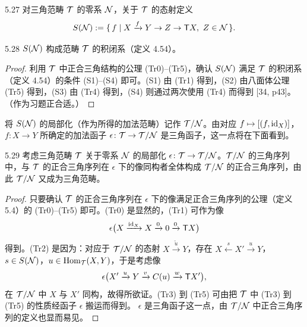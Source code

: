 \begin{definition}{5.27}
对三角范畴 $\mathcal{T}$ 的零系 $\mathcal{N}$，关于 $\mathcal{T}$ 的态射定义
\[
  S(\mathcal{N}) := \{\, f \mid X\xrightarrow{f}Y\to Z\to \mathsf{T} X,\ Z\in\mathcal{N} \,\}.
\]
\end{definition}

\begin{proposition}{5.28}
$S(\mathcal{N})$ 构成范畴 $\mathcal{T}$ 的积闭系（定义 4.54）。
\end{proposition}

\begin{proof}
利用 $\mathcal{T}$ 中正合三角结构的公理 (Tr0)–(Tr5)，确认 $S(\mathcal{N})$ 满足 $\mathcal{T}$ 的积闭系（定义 4.54）的条件 (S1)–(S4) 即可。(S1) 由 (Tr1) 得到，(S2) 由八面体公理 (Tr5) 得到，(S3) 由 (Tr4) 得到，(S4) 则通过两次使用 (Tr4) 而得到 [34, p43]。（作为习题正合适。）
\end{proof}


将 $S(\mathcal{N})$ 的局部化（作为所得的加法范畴）记作 $\mathcal{T}/\mathcal{N}$。由对应 $f\mapsto[(f,\mathrm{id}_X)]$，$f\colon X\to Y$ 所确定的加法函子 $\epsilon\colon\mathcal{T}\to\mathcal{T}/\mathcal{N}$ 是三角函子，这一点将在下面看到。

\begin{proposition}{5.29}
考虑三角范畴 $\mathcal{T}$ 关于零系 $\mathcal{N}$ 的局部化 $\epsilon\colon\mathcal{T}\to\mathcal{T}/\mathcal{N}$。$\mathcal{T}/\mathcal{N}$ 的三角序列中，与 $\mathcal{T}$ 的正合三角序列在 $\epsilon$ 下的像同构者全体构成 $\mathcal{T}/\mathcal{N}$ 的正合三角序列，由此 $\mathcal{T}/\mathcal{N}$ 又成为三角范畴。
\end{proposition}

\begin{proof}
只要确认 $\mathcal{T}$ 的正合三角序列在 $\epsilon$ 下的像满足正合三角序列的公理（定义 5.4）的 (Tr0)–(Tr5) 即可。(Tr0) 是显然的，(Tr1) 可作为像
\[
  \epsilon\bigl(X\xrightarrow{\mathrm{id}_X}X\xrightarrow{0}0\xrightarrow{0}\mathsf{T} X\bigr)
\]
得到。(Tr2) 是因为：对应于 $\mathcal{T}/\mathcal{N}$ 的态射 $X\xrightarrow{\tilde u}Y$，存在 $X\xleftarrow{s}X'\xrightarrow{u}Y$，$s\in S(\mathcal{N})$，$u\in\operatorname{Hom}_{\mathcal{T}}(X,Y)$，于是考虑像
\[
  \epsilon\bigl(X'\xrightarrow{u}Y\xrightarrow{v}C(u)\xrightarrow{w}\mathsf{T} X'\bigr),
\]
在 $\mathcal{T}/\mathcal{N}$ 中 $X$ 与 $X'$ 同构，故得所欲证。(Tr3) 到 (Tr5) 可由把 $\mathcal{T}$ 中 (Tr3) 到 (Tr5) 的性质经函子 $\epsilon$ 搬运而得到。
$\epsilon$ 是三角函子这一点，由 $\mathcal{T}/\mathcal{N}$ 中正合三角序列的定义也显而易见。
\end{proof}

